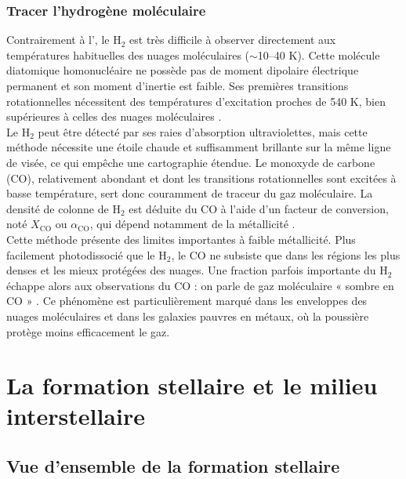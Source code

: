 \subsubsection{Tracer l'hydrogène moléculaire}

Contrairement à l'\HI, le H$_2$ est très difficile à observer directement aux températures habituelles des nuages moléculaires ($\sim$10--40 K). Cette molécule diatomique homonucléaire ne possède pas de moment dipolaire électrique permanent et son moment d'inertie est faible. Ses premières transitions rotationnelles nécessitent des températures d'excitation proches de 540 K, bien supérieures à celles des nuages moléculaires \citep{Ferriere_2001, ISF2011}.\\\indent
Le H$_2$ peut être détecté par ses raies d'absorption ultraviolettes, mais cette méthode nécessite une étoile chaude et suffisamment brillante sur la même ligne de visée, ce qui empêche une cartographie étendue. Le monoxyde de carbone (CO), relativement abondant et dont les transitions rotationnelles sont excitées à basse température, sert donc couramment de traceur du gaz moléculaire. La densité de colonne de H$_2$ est déduite du CO à l'aide d'un facteur de conversion, noté $X_{\mathrm{CO}}$ ou $\alpha_{\mathrm{CO}}$, qui dépend notamment de la métallicité \citep{Bolatto2013}.\\\indent
Cette méthode présente des limites importantes à faible métallicité. Plus facilement photodissocié que le H$_2$, le CO ne subsiste que dans les régions les plus denses et les mieux protégées des nuages. Une fraction parfois importante du H$_2$ échappe alors aux observations du CO : on parle de gaz moléculaire « sombre en CO » \citep{Bolatto2013, Wolfire2010}. Ce phénomène est particulièrement marqué dans les enveloppes des nuages moléculaires et dans les galaxies pauvres en métaux, où la poussière protège moins efficacement le gaz.

\section{La formation stellaire et le milieu interstellaire}
\label{sec:SF_and_ism}
\subsection{Vue d'ensemble de la formation stellaire}

